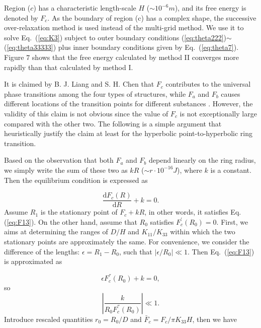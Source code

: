 \documentclass[nottitlepage]{article}
\begin{document}
       Region ($c$) has a characteristic length-scale $H$ ($\sim 10^{-6}m$), and its free energy is denoted by $F_c$.  As the boundary of region (c) has a complex shape, the successive over-relaxation method is used instead of the multi-grid method. We use it to solve Eq.~(\ref{eq:K3}) subject to outer boundary conditions (\ref{eq:theta222})$\sim$(\ref{eq:theta33333}) plus inner boundary conditions given by Eq.~(\ref{eq:theta7}). %
        Figure $7$ shows that the free energy calculated by method II converges more rapidly than that calculated by method I. %

      
       It is claimed by B. J. Liang and S. H. Chen that $F_c$ contributes to the universal phase transitions among the four types of structures, while $F_a$ and $F_b$ causes different locations of the transition points for different substances \cite{liang}. However, the validity of this claim is not obvious since the value of  $F_c$ is not exceptionally large compared with the other two. The following is a simple argument that heuristically justify the claim at least for the hyperbolic point-to-hyperbolic ring transition.

      Based on the observation that both $F_a$ and $F_b$ depend linearly on the ring radius,  we simply write the sum of these two as $kR$ ($\sim r\cdot 10^{-16}J$), where $k$ is a constant. Then the equilibrium condition is expressed as

       \begin{equation}\label{eq:F13}
       \frac{\mathrm{d}F_c(R)}{\mathrm{d}R}+k=0.
       \end{equation}
      Assume $R_1$ is the stationary point of $F_c+kR$, in other words, it satisfies Eq. (\ref{eq:F13}). On the other hand, assume that $R_0$ satisfies $F_c^{'}(R_0)=0$. First, we aims at determining the ranges of $D/H$ and $K_{11}/K_{33}$ within which the two stationary points are approximately the same.  For convenience, we consider the difference of the lengths: $\epsilon = R_1-R_0$, such that $|\epsilon/R_0|\ll 1$. Then Eq.~(\ref{eq:F13}) is approximated as

       \begin{equation}\label{eq:F14}
              \epsilon F_c^{''}(R_0)+k=0,
              \end{equation}
         so
            \begin{equation}\label{eq:k}
             \left|\frac{k}{R_0F_c^{''}(R_0)}\right|\ll 1.
            \end{equation}
Introduce rescaled quantities $r_0=R_0/D$ and $\bar{F}_c=F_c/\pi K_{33}H$, then we have
\end{document}
